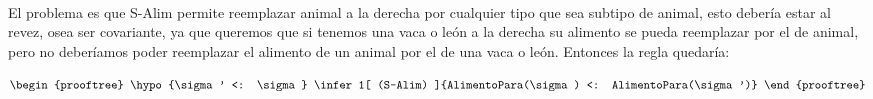 
\hfill\\
 \\

\begin{solucion*}
\begin{center}
\end{center}

\hfill\\


 El problema es que S-Alim permite reemplazar animal a la derecha por
cualquier tipo que sea subtipo de animal, esto debería estar al revez, osea ser
covariante, ya que queremos que si tenemos una vaca o león a la derecha su
alimento se pueda reemplazar por el de animal, pero no deberíamos poder
reemplazar el alimento de un animal por el de una vaca o león. Entonces la regla
quedaría:

\[
\begin{prooftree}
    \hypo{\sigma' <: \sigma}
    \infer1[ (S-Alim) ]{AlimentoPara(\sigma) <: AlimentoPara(\sigma')}
\end{prooftree}
\]
\end{solucion*}
